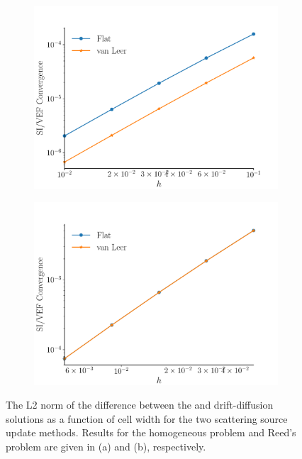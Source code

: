 	\begin{figure}[htb]
		\centering
		\begin{subfigure}{.5\textwidth}
			\centering
			\includegraphics[width=\textwidth]{figs/solconv.pdf}
			\caption{}
			\label{fig:homo}
		\end{subfigure}
		\hspace{-2em}
		\begin{subfigure}{.5\textwidth}
			\centering
			\includegraphics[width=\textwidth]{figs/solconv1.pdf}
			\caption{}
			\label{fig:reed}
		\end{subfigure}
		\caption{The L2 norm of the difference between the \SN and drift-diffusion solutions as a function of cell width for the two scattering source update methods. Results for the homogeneous problem and Reed's problem are given in (a) and (b), respectively.}
	\end{figure}

